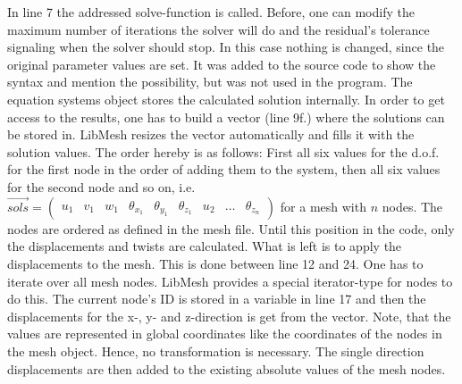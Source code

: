    In line 7 the addressed solve-function is called. Before, one can modify the maximum number of iterations the solver will do and the residual's tolerance signaling when the solver should stop. In this case nothing is changed, since the original parameter values are set. It was added to the source code to show the syntax and mention the possibility, but was not used in the program. The equation systems object stores the calculated solution internally. In order to get access to the results, one has to build a vector (line 9f.) where the solutions can be stored in. LibMesh resizes the vector automatically and fills it with the solution values. The order hereby is as follows: First all six values for the d.o.f. for the first node in the order of adding them to the system, then all six values for the second node and so on, i.e. $\overrightarrow{sols} = \begin{pmatrix}
   u_1 & v_1 & w_1 & \theta_{x_1} & \theta_{y_1} & \theta_{z_1} & u_2 & \ldots & \theta_{z_n}
   \end{pmatrix}$ for a mesh with $n$ nodes. The nodes are ordered as defined in the mesh file. Until this position in the code, only the displacements and twists are calculated. What is left is to apply the displacements to the mesh. This is done between line 12 and 24. One has to iterate over all mesh nodes. LibMesh provides a special iterator-type for nodes to do this. The current node's ID is stored in a variable in line 17 and then the displacements for the x-, y- and z-direction is get from the vector. Note, that the values are represented in global coordinates like the coordinates of the nodes in the mesh object. Hence, no transformation is necessary. The single direction displacements are then added to the existing absolute values of the mesh nodes.

   
   
   
